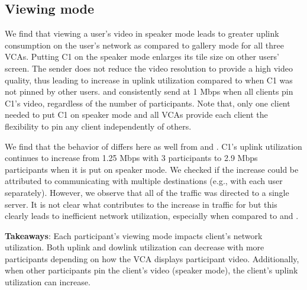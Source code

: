 \subsection{Viewing mode}
We find that viewing a user's video in speaker mode leads to greater uplink consumption on the user's network as compared to gallery mode for all three VCAs. Putting C1 on the speaker mode enlarges its tile size on other users' screen. The sender does not reduce the video resolution to provide a high video quality, thus leading to increase in uplink utilization compared to when C1 was not pinned by other users. \zoom and \meet consistently send at 1 Mbps when all clients pin C1's video, regardless of the number of participants. Note that, only one client needed to put C1 on speaker mode and all VCAs provide each client the flexibility to pin any client independently of others.

We find that the behavior of \teams differs here as well from \meet and \zoom. C1's uplink utilization continues to increase from 1.25 Mbps with 3 participants to 2.9 Mbps participants when it is put on speaker mode. We checked if the increase could be attributed to \teams communicating with multiple destinations (e.g., with each user separately). However, we observe that all of the traffic was directed to a single server. It is not clear what contributes to the increase in traffic for \teams but this clearly leads to inefficient network utilization, especially when compared to \zoom and \meet. 

\textbf{Takeaways}: Each participant's viewing mode impacts client's network utilization. Both uplink and dowlink utilization can decrease with more participants depending on how the VCA displays participant video. Additionally, when other participants pin the client's video (speaker mode), the client's uplink utilization can increase. 

